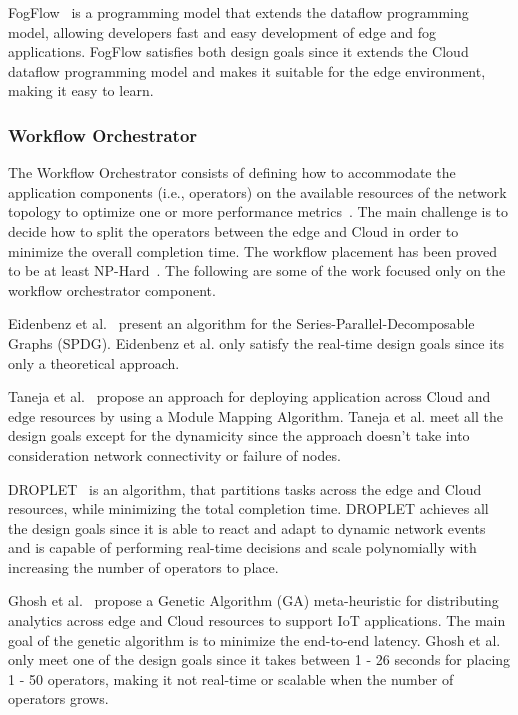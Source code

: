 FogFlow~\cite{8022859} is a programming model that extends the dataflow programming model, allowing developers fast and easy development of edge and fog applications. FogFlow satisfies both design goals since it extends the Cloud dataflow programming model and makes it suitable for the edge environment, making it easy to learn.

\subsubsection{Workflow Orchestrator}

The Workflow Orchestrator consists of defining how to accommodate the application components (i.e., operators) on the available resources of the network topology to optimize one or more performance metrics~\cite{8752924}. The main challenge is to decide how to split the operators between the edge and Cloud in order to minimize the overall completion time. The workflow placement has been proved to be at least NP-Hard~\cite{Benoit:2013}. The following are some of the work focused only on the workflow orchestrator component.

Eidenbenz et al.~\cite{Eidenbenz:2016} present an algorithm for the Series-Parallel-Decomposable Graphs (SPDG). Eidenbenz et al. only satisfy the real-time design goals since its only a theoretical approach. %

Taneja et al.~\cite{Taneja:2017} propose an approach for deploying application across Cloud and edge resources by using a Module Mapping Algorithm. Taneja et al. meet all the design goals except for the dynamicity since the approach doesn't take into consideration network connectivity or failure of nodes.

DROPLET~\cite{8457776} is an algorithm, that partitions tasks across the edge and Cloud resources, while minimizing the total completion time. DROPLET achieves all the design goals since it is able to react and adapt to dynamic network events and is capable of performing real-time decisions and scale polynomially with increasing the number of operators to place. 

Ghosh et al.~\cite{Ghosh:2018} propose a Genetic Algorithm (GA) meta-heuristic for distributing analytics across edge and Cloud resources to support IoT applications. The main goal of the genetic algorithm is to minimize the end-to-end latency. Ghosh et al. only meet one of the design goals since it takes between 1 - 26 seconds for placing 1 - 50 operators, making it not real-time or scalable when the number of operators grows.

